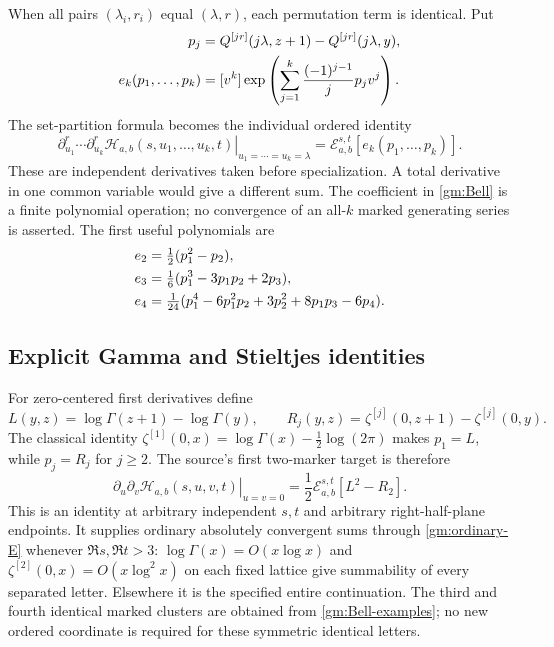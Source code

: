 When all pairs \((\lambda_i,r_i)\) equal \((\lambda,r)\), each
permutation term is identical.  Put
\begin{align}\label{gm:Bell}
 p_j&=Q^{[jr]}(j\lambda,z+1)-Q^{[jr]}(j\lambda,y),\notag\\
 e_k(p_1,\ldots,p_k)
   &=[v^k]\exp\left(\sum_{j=1}^k\frac{(-1)^{j-1}}j p_jv^j\right).
\end{align}
The set-partition formula becomes the individual ordered identity
\begin{equation}\label{gm:identical}
 \left.\partial_{u_1}^r\cdots\partial_{u_k}^r
       \mathcal H_{a,b}(s,u_1,\ldots,u_k,t)
                         \right|_{u_1=\cdots=u_k=\lambda}
       =\mathcal E_{a,b}^{s,t}[e_k(p_1,\ldots,p_k)].
\end{equation}
These are independent derivatives taken before specialization.  A
total derivative in one common variable would give a different sum.
The coefficient in \eqref{gm:Bell} is a finite polynomial operation;
no convergence of an all-\(k\) marked generating series is asserted.
The first useful polynomials are
\begin{align}\label{gm:Bell-examples}
 e_2&=\tfrac12(p_1^2-p_2),\notag\\
 e_3&=\tfrac16(p_1^3-3p_1p_2+2p_3),\notag\\
 e_4&=\tfrac1{24}
       (p_1^4-6p_1^2p_2+3p_2^2+8p_1p_3-6p_4).
\end{align}

\subsection{Explicit Gamma and Stieltjes identities}

For zero-centered first derivatives define
\[
 L(y,z)=\log\Gamma(z+1)-\log\Gamma(y),\qquad
 R_j(y,z)=\zeta^{[j]}(0,z+1)-\zeta^{[j]}(0,y).
\]
The classical identity
\(\zeta^{[1]}(0,x)=\log\Gamma(x)-\tfrac12\log(2\pi)\)
\cite{DLMF} makes \(p_1=L\), while \(p_j=R_j\) for
\(j\ge2\).  The source's first two-marker target is therefore
\begin{equation}\label{gm:gamma-square}
 \boxed{\left.\partial_u\partial_v
       \mathcal H_{a,b}(s,u,v,t)\right|_{u=v=0}
       =\frac12\mathcal E_{a,b}^{s,t}[L^2-R_2].}
\end{equation}
This is an identity at arbitrary independent \(s,t\) and arbitrary
right-half-plane endpoints.  It supplies ordinary absolutely convergent
sums through \eqref{gm:ordinary-E} whenever \(\Re s,\Re t>3\):
\(\log\Gamma(x)=O(x\log x)\) and
\(\zeta^{[2]}(0,x)=O(x\log^2x)\) on each fixed lattice give
summability of every separated letter.  Elsewhere it is the specified
entire continuation.  The third and fourth identical marked clusters
are obtained from \eqref{gm:Bell-examples}; no new ordered coordinate
is required for these symmetric identical letters.

